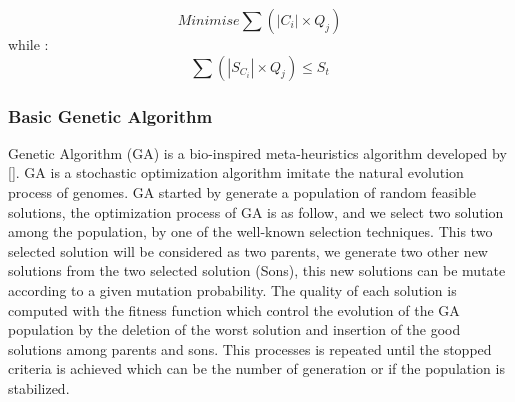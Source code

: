 \documentclass[preprint,12pt]{elsarticle}
\begin{document}
\begin{equation}
Minimise \sum (|C_{i}| \times Q_{j}) 
\end{equation}
while :
\begin{equation}
\sum (|S_{C_{i}}| \times Q_{j}) \leqslant S_{t} 
\end{equation}
\subsubsection{Basic Genetic Algorithm}
Genetic Algorithm (GA) is a bio-inspired meta-heuristics algorithm developed by []. GA is a stochastic optimization algorithm imitate the natural evolution process of genomes. GA started by generate a population of random feasible solutions, the optimization process of GA is as follow, and we select two solution among the population, by one of the well-known selection techniques. This two selected solution will be considered as two parents, we generate two other new solutions from the two selected solution (Sons), this new solutions can be mutate according to a given mutation probability. The quality of each solution is computed with the fitness function which control the evolution of the GA population by the deletion of the worst solution and insertion of the good solutions among   parents and sons. This processes is repeated until the stopped criteria is achieved which can be the number of generation or if the population is stabilized.
\end{document}
